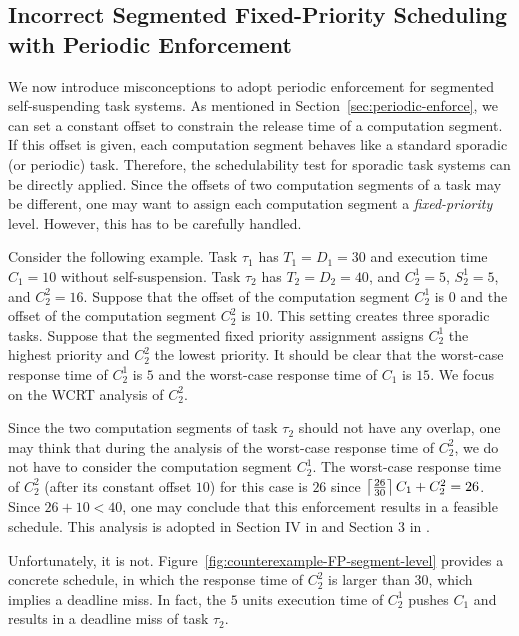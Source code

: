 \subsection{Incorrect Segmented Fixed-Priority Scheduling with Periodic Enforcement}
\label{sec:wrong-periodic}

We now introduce misconceptions to adopt periodic enforcement for segmented self-suspending task systems. As mentioned in Section~\ref{sec:periodic-enforce}, we can set a constant offset to constrain the release time of a computation segment. If this offset is given, each computation segment behaves like a standard sporadic (or periodic) task. Therefore, the schedulability test for sporadic task systems can be directly applied. Since the offsets of two computation segments of a task may be different, one may want to assign each computation segment a \emph{fixed-priority} level.  However, this has to be carefully handled. 

Consider the following example. Task $\tau_1$ has $T_1=D_1=30$ and execution time $C_1=10$ without self-suspension. Task $\tau_2$ has $T_2=D_2=40$, and $C_2^1=5$, $S_2^1=5$, and $C_2^2=16$. Suppose that the offset of the computation segment $C_2^1$ is $0$ and the offset of the computation segment $C_2^2$ is $10$. This setting creates three sporadic tasks.
Suppose that the segmented fixed priority assignment assigns $C_2^1$ the highest priority and $C_2^2$ the lowest priority. It should be clear that the worst-case response time of $C_2^1$ is $5$ and the worst-case response time of $C_1$ is $15$. We focus on the WCRT analysis of $C_2^2$.


Since the two computation segments of task $\tau_2$ should not have any overlap, one may think that during the analysis of the worst-case response time of $C_2^2$, we do not have to consider the computation segment $C_2^1$. The worst-case response time of $C_2^2$ (after its constant offset $10$) for this case is $26$ since $\left\lceil{\frac{26}{30}}\right\rceil C_1 + C_2^2 = 26$. 
Since $26+10 < 40$, one may conclude that this enforcement results in a feasible schedule. This analysis is adopted in Section IV in \cite{RTSS-KimANR13} and Section 3 in \cite{DBLP:journals/ieicet/DingTT09}. 

Unfortunately, it is not. Figure~\ref{fig:counterexample-FP-segment-level} provides a concrete schedule, in which the response time of $C_2^2$ is larger than $30$, which implies a deadline miss. In fact, the $5$ units execution time of $C_2^1$ pushes $C_1$ and results in a deadline miss of task $\tau_2$.




